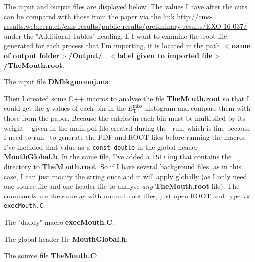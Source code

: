 The input and output files are displayed below. The values I have after the cuts can be compared with those from the paper via the link \url{http://cms-results.web.cern.ch/cms-results/public-results/preliminary-results/EXO-16-037/} under the "Additional Tables" heading. If I want to examine the .root file generated for each process that I'm importing, it is located in the path \textbf{$<$name of output folder$>$/Output/\_$<$label given to imported file$>$/TheMouth.root}.

The input file \textbf{DMbkgmonoj.ma}:



Then I created some C++ macros to analyse the file \textbf{TheMouth.root} so that I could get the $y$-values of each bin in the $E_{\mathrm{T}}^{\mathrm{miss}}$ histogram and compare them with those from the paper. Because the entries in each bin must be multiplied by its weight -- given in the main.pdf file created during the \madanalysis\ run, which is fine because I need to run \madanalysis\ to generate the PDF and ROOT files before running the macros -- I've included that value as a \texttt{const double} in the global header \textbf{MouthGlobal.h}. In the same file, I've added a \texttt{TString} that contains the directory to \textbf{TheMouth.root}. So if I have several background files, as in this case, I can just modify the string once and it will apply globally (as I only need one source file and one header file to analyse \emph{any} \textbf{TheMouth.root} file). The commands are the same as with normal .root files; just open ROOT and type \verb!.x execMouth.C!.

The "daddy" macro \textbf{execMouth.C}:



The global header file \textbf{MouthGlobal.h}:



The source file \textbf{TheMouth.C}:



